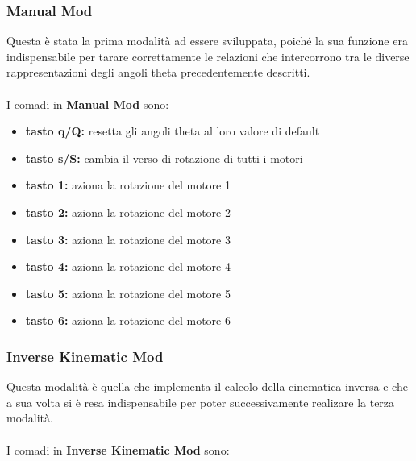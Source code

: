\documentclass[a4paper]{article}
\begin{document}
    \subsubsection{Manual Mod}
    
    \begin{text}
        Questa è stata la prima modalità ad essere sviluppata, poiché la sua funzione era indispensabile per tarare correttamente le relazioni che intercorrono tra le diverse rappresentazioni degli angoli theta precedentemente descritti. \\ \\
        I comadi in \textbf{Manual Mod} sono:
    \end{text}
    
    \begin{itemize}
      \item \textbf{tasto q/Q:} resetta gli angoli theta al loro valore di default
      \item \textbf{tasto s/S:} cambia il verso di rotazione di tutti i motori
      \item \textbf{tasto 1:} aziona la rotazione del motore 1
      \item \textbf{tasto 2:} aziona la rotazione del motore 2
      \item \textbf{tasto 3:} aziona la rotazione del motore 3
      \item \textbf{tasto 4:} aziona la rotazione del motore 4
      \item \textbf{tasto 5:} aziona la rotazione del motore 5
      \item \textbf{tasto 6:} aziona la rotazione del motore 6
    \end{itemize}
    
    \subsubsection{Inverse Kinematic Mod}
    
    \begin{text}
        Questa modalità è quella che implementa il calcolo della cinematica inversa e che a sua volta si è resa indispensabile per poter successivamente realizare la terza modalità. \\ \\
        I comadi in \textbf{Inverse Kinematic Mod} sono:
    \end{text}
    
\end{document}
